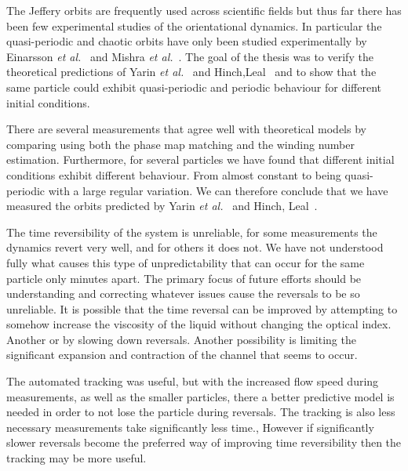 The Jeffery orbits are frequently used across scientific fields but thus far there has been few experimental studies 
of the orientational dynamics. In particular the quasi-periodic and chaotic orbits have only been studied experimentally
by Einarsson \emph{et al.}~\cite{JonasExperiment} and Mishra \emph{et al.}~\cite{Mishra}.
The goal of the thesis was to verify the theoretical predictions of Yarin \emph{et al.}~\cite{Yarin} and Hinch,Leal~\cite{Leal} and to show that the same particle could exhibit quasi-periodic and periodic behaviour for different initial conditions.


There are several measurements that agree well with theoretical models by comparing using both the phase map matching and the winding number estimation. Furthermore, for several particles we have found that different initial conditions exhibit different behaviour. 
From almost constant to being quasi-periodic with a large regular variation. We can therefore conclude that we have measured the
orbits predicted by Yarin \emph{et al.}~\cite{Yarin} and Hinch, Leal~\cite{Leal}.

The time reversibility of the system is unreliable, for some measurements the dynamics revert very well, and for others it does not. 
We have not understood fully what causes this type of unpredictability that can occur for the same particle only 
minutes apart. The primary focus of future efforts should be understanding and correcting whatever issues cause the 
reversals to be so unreliable. It is possible that the time reversal can be improved by attempting to somehow increase the viscosity of the liquid
without changing the optical index. Another or by slowing down reversals. Another possibility is limiting the 
significant expansion and contraction of the channel that seems to occur.

The automated tracking was useful, but with the increased flow speed during measurements, as well as the smaller particles, 
there a better predictive model is needed in order to not lose the particle during reversals. The tracking is also less necessary 
measurements take significantly less time., However if significantly slower reversals become the preferred way of improving 
time reversibility then the tracking may be more useful.